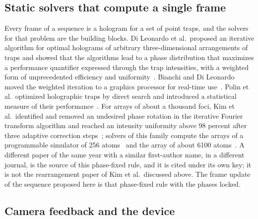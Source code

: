 \subsection{Static solvers that compute a single frame}

Every frame of a sequence is a hologram for a set of point traps, and the solvers for that problem are the building blocks. Di Leonardo et al.\ proposed an iterative algorithm for optimal holograms of arbitrary three-dimensional arrangements of traps and showed that the algorithms lead to a phase distribution that maximizes a performance quantifier expressed through the trap intensities, with a weighted form of unprecedented efficiency and uniformity~\cite{dileonardo}. Bianchi and Di Leonardo moved the weighted iteration to a graphics processor for real-time use~\cite{bianchi}. Polin et al.\ optimized holographic traps by direct search and introduced a statistical measure of their performance~\cite{polin}. For arrays of about a thousand foci, Kim et al.\ identified and removed an undesired phase rotation in the iterative Fourier transform algorithm and reached an intensity uniformity above 98 percent after three adaptive correction steps~\cite{kimol}; solvers of this family compute the arrays of a programmable simulator of 256 atoms~\cite{ebadi} and the array of about 6100 atoms~\cite{manetsch}. A different paper of the same year with a similar first-author name, in a different journal, is the source of this phase-fixed rule, and it is cited under its own key; it is not the rearrangement paper of Kim et al.\ discussed above. The frame update of the sequence proposed here is that phase-fixed rule with the phases locked.

\subsection{Camera feedback and the device}

